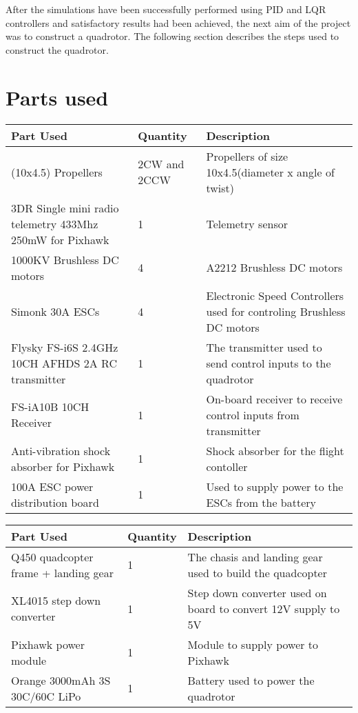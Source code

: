 After the simulations have been successfully performed using PID and LQR controllers and satisfactory results
had been achieved, the next aim of the project was to construct a quadrotor. The following section describes
the steps used to construct the quadrotor.

\section{Parts used}

\begin{tabu} to 1\textwidth { | X[c] | X[c] | X[c] | }
  \hline
  Part Used & Quantity & Description \\
  \hline \hline
  (10x4.5) Propellers & 2CW and 2CCW  & Propellers of size 10x4.5(diameter x angle of twist)\\
  \hline
  3DR Single mini radio telemetry 433Mhz 250mW for Pixhawk & 1 & Telemetry sensor\\
  \hline
  1000KV Brushless DC motors & 4 & A2212 Brushless DC motors\\
  \hline
  Simonk 30A ESCs & 4 & Electronic Speed Controllers used for controling Brushless DC motors\\
  \hline
  Flysky FS-i6S 2.4GHz 10CH AFHDS 2A RC transmitter & 1 & The transmitter used to send control inputs to the quadrotor\\
  \hline
  FS-iA10B 10CH Receiver & 1 & On-board receiver to receive control inputs from transmitter\\
  \hline
  Anti-vibration shock absorber for Pixhawk & 1 & Shock absorber for the flight contoller\\
  \hline
  100A ESC power distribution board & 1 & Used to supply power to the ESCs from the battery\\
  \hline
\end{tabu}
\newpage
\noindent
\begin{tabu} to 1\textwidth { | X[c] | X[c] | X[c] | }
  \hline
  Part Used & Quantity & Description \\
  \hline \hline
  Q450 quadcopter frame + landing gear & 1 & The chasis and landing gear used to build the quadcopter\\
  \hline
  XL4015 step down converter & 1 & Step down converter used on board to convert 12V supply to 5V\\
  \hline
  Pixhawk power module & 1 & Module to supply power to Pixhawk\\
  \hline
  Orange 3000mAh 3S 30C/60C LiPo & 1 & Battery used to power the quadrotor\\
  \hline \hline
\end{tabu}

